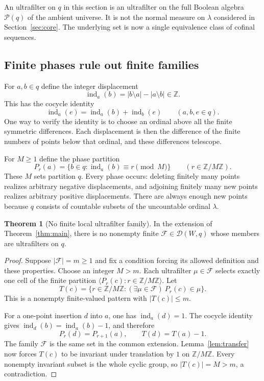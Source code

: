 \documentclass[11pt,letterpaper]{article}
\theoremstyle{definition}
\newtheorem{theorem}[definition]{Theorem}
\numberwithin{equation}{section}
\newcommand{\DD}{\mathscr D}
\newcommand{\ind}{\operatorname{ind}}
\begin{document}
An ultrafilter on $q$ in this section is an ultrafilter on the full Boolean algebra $\mathcal P(q)$ of the ambient universe. It is not the normal measure on $\lambda$ considered in Section~\ref{sec:core}. The underlying set is now a single equivalence class of cofinal sequences.

\subsection{Finite phases rule out finite families}

For $a,b\in q$ define the integer displacement
\[
 \ind_a(b)=|b\setminus a|-|a\setminus b|\in\mathbb Z.
\]
This has the cocycle identity
\begin{equation}\label{eq:cocycle}
 \ind_a(e)=\ind_a(b)+\ind_b(e)\qquad(a,b,e\in q).
\end{equation}
One way to verify the identity is to choose an ordinal above all the finite symmetric differences. Each displacement is then the difference of the finite numbers of points below that ordinal, and these differences telescope.

For $M\geq1$ define the phase partition
\[
 P_r(a)=\{b\in q:\ind_a(b)\equiv r\pmod M\}
 \qquad(r\in\mathbb Z/M\mathbb Z).
\]
These $M$ sets partition $q$. Every phase occurs: deleting finitely many points realizes arbitrary negative displacements, and adjoining finitely many new points realizes arbitrary positive displacements. There are always enough new points because $q$ consists of countable subsets of the uncountable ordinal $\lambda$.

\begin{theorem}[No finite local ultrafilter family]\label{thm:noUF}
In the extension of Theorem~\ref{thm:main}, there is no nonempty finite $\mathcal F\in\DD(W,q)$ whose members are ultrafilters on $q$.
\end{theorem}
\begin{proof}
Suppose $|\mathcal F|=m\geq1$ and fix a condition forcing its allowed definition and these properties. Choose an integer $M>m$. Each ultrafilter $\mu\in\mathcal F$ selects exactly one cell of the finite partition $\langle P_r(c):r\in\mathbb Z/M\mathbb Z\rangle$. Let
\[
 T(c)=\{r\in\mathbb Z/M\mathbb Z:
                 (\exists\mu\in\mathcal F)\ P_r(c)\in\mu\}.
\]
This is a nonempty finite-valued pattern with $|T(c)|\leq m$.

For a one-point insertion $d$ into $a$, one has $\ind_a(d)=1$. The cocycle identity gives $\ind_d(b)=\ind_a(b)-1$, and therefore
\[
 P_r(d)=P_{r+1}(a),\qquad T(d)=T(a)-1.
\]
The family $\mathcal F$ is the same set in the common extension. Lemma~\ref{lem:transfer} now forces $T(c)$ to be invariant under translation by $1$ on $\mathbb Z/M\mathbb Z$. Every nonempty invariant subset is the whole cyclic group, so $|T(c)|=M>m$, a contradiction.
\end{proof}
\end{document}
